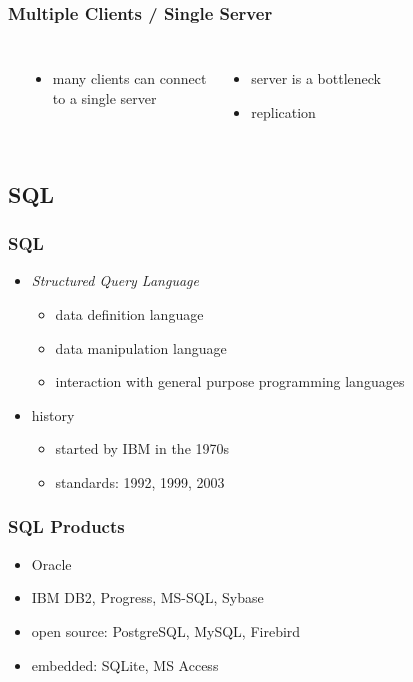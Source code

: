 \documentclass[dvipsnames]{beamer}
\theoremstyle{plain}
\begin{document}
\begin{frame}
  \frametitle{Multiple Clients / Single Server}

  \begin{columns}
    \begin{center}
    \end{center}

    \begin{itemize}
      \item many clients can connect\\
        to a single server
    \end{itemize}

    \pause
    \bigskip
    \begin{itemize}
      \item server is a bottleneck
      \item replication
    \end{itemize}
  \end{columns}
\end{frame}

\subsection{SQL}

\begin{frame}
  \frametitle{SQL}

  \begin{itemize}
    \item \emph{Structured Query Language}
    \begin{itemize}
      \item data definition language
      \item data manipulation language
      \item interaction with general purpose programming languages
    \end{itemize}

    \pause
    \bigskip
    \item history
    \begin{itemize}
      \item started by IBM in the 1970s
      \item standards: 1992, 1999, 2003
    \end{itemize}
  \end{itemize}
\end{frame}

\begin{frame}
  \frametitle{SQL Products}

  \begin{itemize}
    \item Oracle
    \item IBM DB2, Progress, MS-SQL, Sybase
    \item open source: PostgreSQL, MySQL, Firebird
    \item embedded: SQLite, MS Access
  \end{itemize}
\end{frame}
\end{document}
